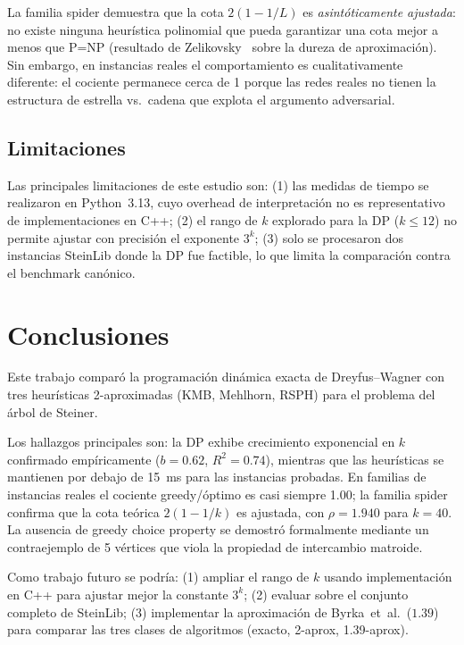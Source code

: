 \documentclass[11pt]{article}
\newcommand{\printbiblio}{\printbibliography}
\newcommand{\printbiblio}{%
    \IfFileExists{references.bib}{}{}%
  }%
\begin{document}
La familia spider demuestra que la cota $2(1-1/L)$ es \emph{asint\'oticamente
ajustada}: no existe ninguna heur\'istica polinomial que pueda garantizar una
cota mejor a menos que P=NP (resultado de Zelikovsky~\cite{Zelikovsky1993}
sobre la dureza de aproximaci\'on).  Sin embargo, en instancias reales el
comportamiento es cualitativamente diferente: el cociente permanece cerca de
1 porque las redes reales no tienen la estructura de estrella vs.\ cadena que
explota el argumento adversarial.

\subsection{Limitaciones}

Las principales limitaciones de este estudio son: (1) las medidas de tiempo
se realizaron en Python~3.13, cuyo overhead de interpretaci\'on no es
representativo de implementaciones en C++; (2) el rango de $k$ explorado
para la DP ($k\le 12$) no permite ajustar con precisi\'on el exponente $3^k$;
(3) solo se procesaron dos instancias SteinLib donde la DP fue factible, lo
que limita la comparaci\'on contra el benchmark can\'onico.

\section{Conclusiones}\label{sec:conclusions}

Este trabajo comparó la programación dinámica exacta de Dreyfus--Wagner con
tres heurísticas 2-aproximadas (KMB, Mehlhorn, RSPH) para el problema del
árbol de Steiner.

Los hallazgos principales son: la DP exhibe crecimiento exponencial en $k$
confirmado empíricamente ($b=0.62$, $R^2=0.74$), mientras que las heurísticas
se mantienen por debajo de 15~ms para las instancias probadas.  En familias
de instancias reales el cociente greedy/óptimo es casi siempre 1.00; la
familia spider confirma que la cota teórica $2(1-1/k)$ es ajustada, con
$\rho=1.940$ para $k=40$.  La ausencia de greedy choice property se demostró
formalmente mediante un contraejemplo de 5 vértices que viola la propiedad
de intercambio matroide.

Como trabajo futuro se podría: (1) ampliar el rango de $k$ usando implementación
en C++ para ajustar mejor la constante $3^k$; (2) evaluar sobre el conjunto
completo de SteinLib; (3) implementar la aproximación de Byrka~et~al.\ ($1.39$)
para comparar las tres clases de algoritmos (exacto, 2-aprox, 1.39-aprox).

\IfFileExists{references.bib}{\printbiblio}{%
  \section*{Referencias}\textcolor{gray}{[references.bib pendiente]}}
\end{document}
